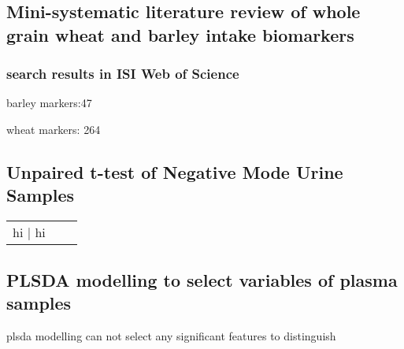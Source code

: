 \subsection{Mini-systematic literature review of whole grain wheat and barley intake biomarkers}
\subsubsection{search results in ISI Web of Science}

barley markers:47

wheat markers: 264

\subsection{Unpaired t-test of Negative Mode Urine Samples}
\begin{tabular}{c|c|c}
	hi | hi
\end{tabular}

\subsection{PLSDA modelling to select variables of plasma samples}
plsda modelling can not select any significant features to distinguish 
